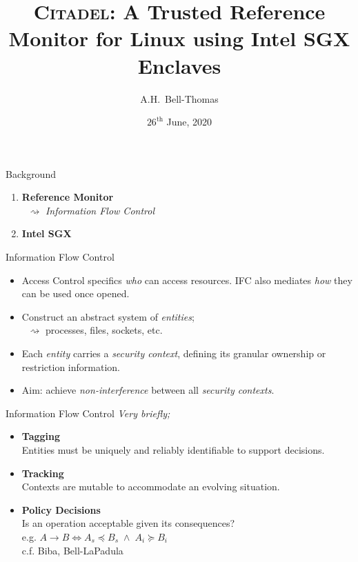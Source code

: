 \documentclass[xcolor=dvipsnames]{beamer}
\title{\textsc{Citadel}: A Trusted Reference Monitor for Linux using Intel SGX Enclaves}
\author{A.H.~Bell-Thomas}
\institute{Computer Laboratory, University of Cambridge}
\date{\scriptsize $26^{\text{th}}$ June, 2020}
\begin{document}
\frame{\titlepage}

\begin{frame}{Background}
\pause
{\large
\begin{enumerate}
    \item \textbf{Reference Monitor} \\
    \pause
    $\;\;\rightsquigarrow$ \textit{Information Flow Control}
    \pause
    \vspace{1cm}
    \item \textbf{Intel SGX}
\end{enumerate}
}
\end{frame}

\begin{frame}{Information Flow Control}
    \begin{itemize}
        \item Access Control specifics \textit{who} can access resources. IFC also mediates \textit{how} they can be used once opened.
        \vspace{5mm}
        \item Construct an abstract system of \textit{entities}; \\
        $\;\;\rightsquigarrow$ processes, files, sockets, etc.
        \vspace{5mm}
        \item Each \textit{entity} carries a \textit{security context}, defining its granular ownership or restriction information.
        \vspace{5mm}
        \item Aim: achieve \textit{non-interference} between all \textit{security contexts}.
    \end{itemize}  
\end{frame}

\begin{frame}{Information Flow Control}  
    \textit{Very briefly;}
    \vspace{3mm}
    \begin{itemize}
        \item \textbf{Tagging} \\
        Entities must be uniquely and reliably identifiable to support decisions.
        \vspace{5mm}
        \item \textbf{Tracking} \\
        Contexts are mutable to accommodate an evolving situation.
        \vspace{5mm}
        \item \textbf{Policy Decisions} \\
        Is an operation acceptable given its consequences? \\
        e.g. $A \rightarrow B \iff A_s \preceq B_s \;\land\; A_i \succeq B_i$ \\
        c.f. Biba, Bell-LaPadula
    \end{itemize}
\end{frame}
\end{document}
